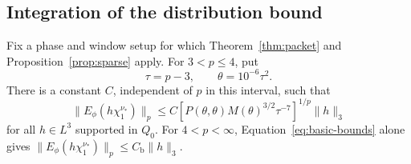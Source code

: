\subsection{Integration of the distribution bound}

\begin{theorem}\label{thm:graph}
Fix a phase and window setup for which Theorem~\ref{thm:packet}
and Proposition~\ref{prop:sparse} apply.  For $3<p\leq4$, put
\begin{equation}\label{eq:theta-choice}
 \tau=p-3,\qquad \theta=10^{-6}\tau^2.
\end{equation}
There is a constant $C$, independent of $p$ in this interval,
such that
\begin{equation}\label{eq:global-graph-bound}
 \|E_\phi(h\chi_1^{\nu_*})\|_p
 \leq C\left[
       P(\theta,\theta)M(\theta)^{3/2}\tau^{-7}
       \right]^{1/p}\|h\|_3
\end{equation}
for all $h\in L^3$ supported in $Q_0$.
For $4<p<\infty$, Equation~\eqref{eq:basic-bounds} alone gives
$\|E_\phi(h\chi_1^{\nu_*})\|_p\leq C_{\mathrm b}\|h\|_3$.
\end{theorem}


